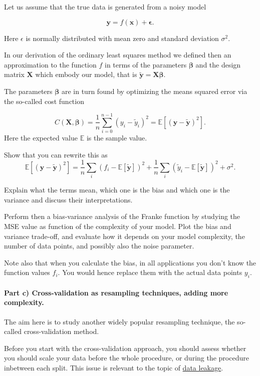 \documentclass[%
oneside,                 %
final,                   %
10pt]{article}
\begin{document}
Let us assume that the true data is generated from a noisy model

\[
\bm{y}=f(\boldsymbol{x}) + \bm{\epsilon}.
\]

Here $\epsilon$ is normally distributed with mean zero and standard
deviation $\sigma^2$.

In our derivation of the ordinary least squares method we defined then
an approximation to the function $f$ in terms of the parameters
$\bm{\beta}$ and the design matrix $\bm{X}$ which embody our model,
that is $\bm{\tilde{y}}=\bm{X}\bm{\beta}$.

The parameters $\bm{\beta}$ are in turn found by optimizing the means
squared error via the so-called cost function

\[
C(\bm{X},\bm{\beta}) =\frac{1}{n}\sum_{i=0}^{n-1}(y_i-\tilde{y}_i)^2=\mathbb{E}\left[(\bm{y}-\bm{\tilde{y}})^2\right].
\]
Here the expected value $\mathbb{E}$ is the sample value. 

Show that you can rewrite  this as
\[
\mathbb{E}\left[(\bm{y}-\bm{\tilde{y}})^2\right]=\frac{1}{n}\sum_i(f_i-\mathbb{E}\left[\bm{\tilde{y}}\right])^2+\frac{1}{n}\sum_i(\tilde{y}_i-\mathbb{E}\left[\bm{\tilde{y}}\right])^2+\sigma^2.
\]

Explain what the terms mean, which one is the bias and which one is
the variance and discuss their interpretations.

Perform then a bias-variance analysis of the Franke function by
studying the MSE value as function of the complexity of your model.
Plot the bias and variance trade-off, and evaluate how it depends on
your model complexity, the number of data points, and possibly also
the noise parameter.




Note also that when you calculate the bias, in all applications you
don't know the function values $f_i$. You would hence replace them
with the actual data points $y_i$.


\paragraph{Part c) Cross-validation as resampling techniques, adding more complexity.}
The aim here is to study  another widely popular
resampling technique, the so-called cross-validation method.

Before you start with the cross-validation approach, you should assess
whether you should scale your data before the whole procedure, or
during the procedure inbetween each split. This issue is relevant to
the topic of \href{{https://en.wikipedia.org/wiki/Leakage_(machine_learning)}}{data leakage}.
\end{document}
